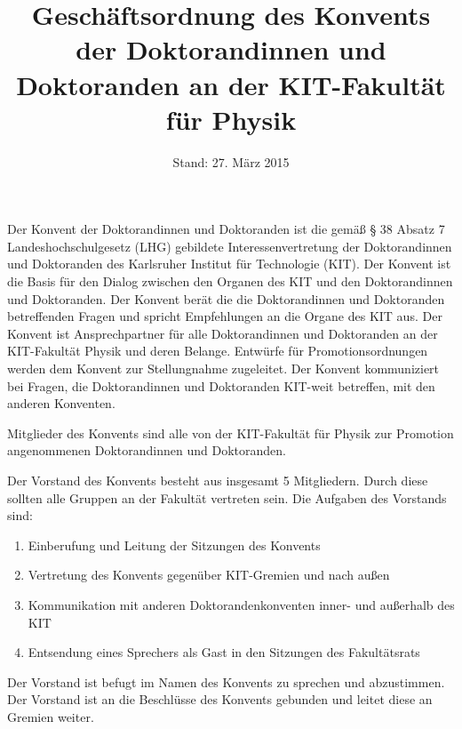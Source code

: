 \documentclass[a4paper, parskip=half, numbers=noenddot]{scrartcl}
\title{Geschäftsordnung des Konvents der Doktorandinnen und Doktoranden an der KIT-Fakultät für Physik}
\date{Stand: 27. März 2015}
\begin{document}
\maketitle



\begin{contract}


\tableofcontents


\label{aufgaben}

Der Konvent der Doktorandinnen und Doktoranden ist die gemäß § 38 Absatz 7
Landeshochschulgesetz (LHG) gebildete Interessenvertretung der Doktorandinnen und
Doktoranden des Karlsruher Institut für Technologie (KIT).
Der Konvent ist die Basis für den Dialog zwischen den Organen des KIT und den Doktorandinnen und Doktoranden.
Der Konvent berät die die Doktorandinnen und Doktoranden betreffenden Fragen und spricht Empfehlungen an die Organe des KIT aus.
Der Konvent ist Ansprechpartner für alle Doktorandinnen und Doktoranden an der KIT-Fakultät Physik und deren Belange.
Entwürfe für Promotionsordnungen werden dem Konvent zur Stellungnahme zugeleitet.
Der Konvent kommuniziert bei Fragen, die Doktorandinnen und Doktoranden KIT-weit betreffen, mit den anderen Konventen.


Mitglieder des Konvents sind alle von der KIT-Fakultät für Physik zur Promotion angenommenen Doktorandinnen und Doktoranden. 


Der Vorstand des Konvents besteht aus insgesamt 5 Mitgliedern. Durch diese sollten alle
Gruppen an der Fakultät vertreten sein.
Die Aufgaben des Vorstands sind:
\begin{enumerate}
	\item Einberufung und Leitung der Sitzungen des Konvents
	\item Vertretung des Konvents gegenüber KIT-Gremien und nach außen
	\item Kommunikation mit anderen Doktorandenkonventen inner- und außerhalb des KIT
	\item Entsendung eines Sprechers als Gast in den Sitzungen des Fakultätsrats
\end{enumerate}
Der Vorstand ist befugt im Namen des Konvents zu sprechen und abzustimmen.
Der Vorstand ist an die Beschlüsse des Konvents gebunden und leitet diese an Gremien weiter.


\end{contract}
\end{document}
